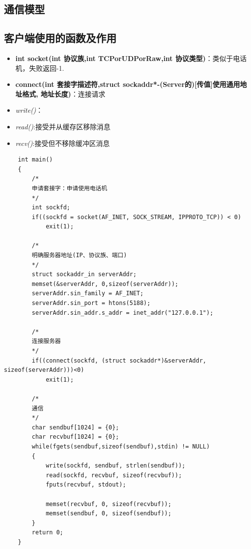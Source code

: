 \documentclass[UTF8,a4paper,8pt]{ctexbook}
\begin{document}
		\subsection{通信模型}
		
		\subsection{客户端使用的函数及作用}
			\begin{itemize}
				\item \textbf{int socket(int 协议族,int TCPorUDPorRaw,int 协议类型)}：类似于电话机，失败返回-1.
				\item \textbf{connect(int 套接字描述符,struct sockaddr*-(Server的)\textbf{[传值]}使用通用地址格式, 地址长度)}：连接请求
				\item \textit{write()}：
				\item \textit{read()}:接受并从缓存区移除消息
				\item \textit{recv()}:接受但不移除缓冲区消息
			\end{itemize}
			\begin{lstlisting}
	int main()
	{
		/*
		申请套接字：申请使用电话机
		*/
		int sockfd;
		if((sockfd = socket(AF_INET, SOCK_STREAM, IPPROTO_TCP)) < 0)
			exit(1);
		
		/*
		明确服务器地址(IP、协议族、端口)
		*/
		struct sockaddr_in serverAddr;
		memset(&serverAddr, 0,sizeof(serverAddr));
		serverAddr.sin_family = AF_INET;
		serverAddr.sin_port = htons(5188);
		serverAddr.sin_addr.s_addr = inet_addr("127.0.0.1");
		
		/*
		连接服务器
		*/
		if((connect(sockfd, (struct sockaddr*)&serverAddr, sizeof(serverAddr)))<0)
			exit(1);
		
		/*
		通信
		*/
		char sendbuf[1024] = {0};
		char recvbuf[1024] = {0};
		while(fgets(sendbuf,sizeof(sendbuf),stdin) != NULL)
		{
			write(sockfd, sendbuf, strlen(sendbuf));
			read(sockfd, recvbuf, sizeof(recvbuf));
			fputs(recvbuf, stdout);
			
			memset(recvbuf, 0, sizeof(recvbuf));
			memset(sendbuf, 0, sizeof(sendbuf));
		}
		return 0;
	}			
			\end{lstlisting}
\end{document}
